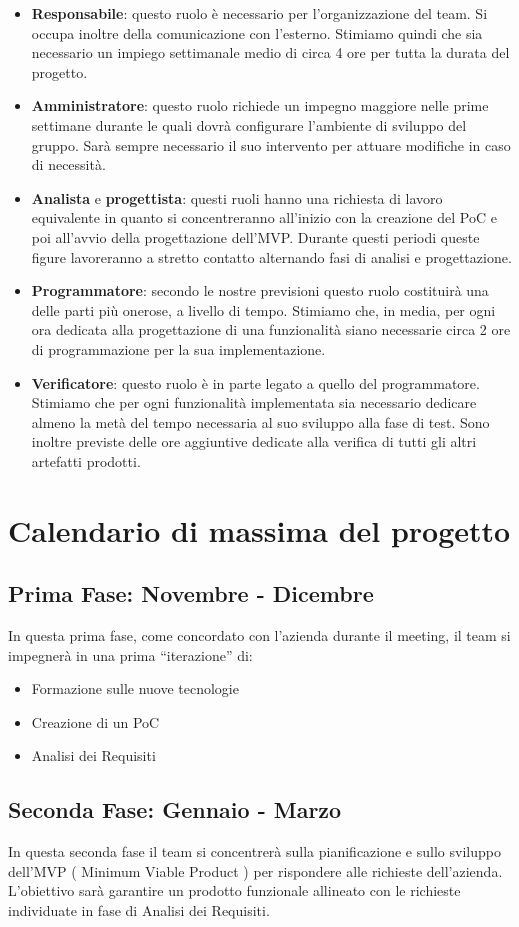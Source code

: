\documentclass{article}
\begin{document}
    \begin{itemize}
        \item{\textbf{Responsabile}: questo ruolo è necessario per l'organizzazione del team. Si occupa inoltre della comunicazione con l'esterno. Stimiamo quindi che sia necessario un impiego settimanale medio di circa 4 ore per tutta la durata del progetto.}
        \item{\textbf{Amministratore}: questo ruolo richiede un impegno maggiore nelle prime settimane durante le quali dovrà configurare l'ambiente di sviluppo del gruppo. Sarà sempre necessario il suo intervento per attuare modifiche in caso di necessità.}
        \item{\textbf{Analista} e \textbf{progettista}: questi ruoli hanno una richiesta di lavoro equivalente in quanto si concentreranno all'inizio con la creazione del PoC e poi all'avvio della progettazione dell'MVP. Durante questi periodi queste figure lavoreranno a stretto contatto alternando fasi di analisi e progettazione.}
        \item{\textbf{Programmatore}: secondo le nostre previsioni questo ruolo costituirà una delle parti più onerose, a livello di tempo. Stimiamo che, in media, per ogni ora dedicata alla progettazione di una funzionalità siano necessarie circa 2 ore di programmazione per la sua implementazione.}
        \item{\textbf{Verificatore}: questo ruolo è in parte legato a quello del programmatore. Stimiamo che per ogni funzionalità implementata sia necessario dedicare almeno la metà del tempo necessaria al suo sviluppo alla fase di test. Sono inoltre previste delle ore aggiuntive dedicate alla verifica di tutti gli altri artefatti prodotti.}
    \end{itemize}

    \section*{Calendario di massima del progetto}
        \subsection*{Prima Fase: Novembre - Dicembre}
        {In questa prima fase, come concordato con l'azienda durante il meeting, il team si impegnerà in una prima “iterazione” di:}
            \begin{itemize}
                \item Formazione sulle nuove tecnologie
                \item Creazione di un PoC
                \item Analisi dei Requisiti
            \end{itemize}
        \subsection*{Seconda Fase: Gennaio - Marzo}
        {In questa seconda fase il team si concentrerà sulla pianificazione e sullo sviluppo dell'MVP ( Minimum Viable Product ) per rispondere alle richieste dell'azienda. L'obiettivo sarà garantire un prodotto funzionale allineato con le richieste individuate in fase di Analisi dei Requisiti.}
\end{document}
